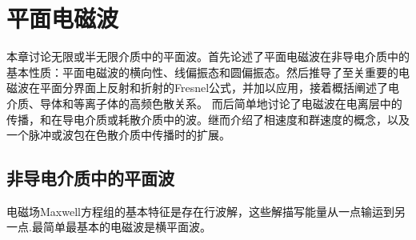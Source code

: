 \chapter{平面电磁波}
\label{chap:plane wave}
本章讨论无限或半无限介质中的平面波。首先论述了平面电磁波在非导电介质中的基本性质：平面电磁波的横向性、线偏振态和圆偏振态。然后推导了至关重要的电磁波在平面分界面上反射和折射的Fresnel公式，并加以应用，接着概括阐述了电介质、导体和等离子体的高频色散关系。%
而后简单地讨论了电磁波在电离层中的传播，和在导电介质或耗散介质中的波。继而介绍了相速度和群速度的概念，以及一个脉冲或波包在色散介质中传播时的扩展。%
\section{非导电介质中的平面波}
电磁场Maxwell方程组的基本特征是存在行波解，这些解描写能量从一点输运到另一点.最简单最基本的电磁波是横平面波。%

